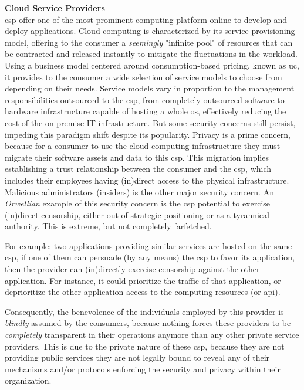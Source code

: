 \documentclass[12pt, titlepage]{uo_temp}
\begin{document}
     \textbf{Cloud Service Providers}\\
     \gls{csp} offer one of the most prominent computing platform online to develop and
     deploy applications.
     Cloud computing is characterized by its service provisioning model, offering to the
     consumer a \emph{seemingly} "infinite pool" of resources that can be contracted and
     released instantly to mitigate the fluctuations in the workload. Using a business
     model centered around consumption-based pricing, known as \gls{uc}, it provides to
     the consumer a wide selection of service models to choose from depending on their
     needs. Service models vary in proportion to the management responsibilities
     outsourced to the \gls{csp}, from completely outsourced software to hardware
     infrastructure capable of hosting a whole \gls{os}, effectively reducing the cost of
     the on-premise IT infrastructure. But some security concerns still persist, impeding
     this paradigm shift despite its popularity. Privacy is a prime concern, because for a
     consumer to use the cloud computing infrastructure they must migrate their software
     assets and data to this \gls{csp}. This migration implies establishing a trust
     relationship between the consumer and the \gls{csp}, which includes their employees
     having (in)direct access to the physical infrastructure. Malicious administrators
     (insiders) is the other major security concern. An \emph{Orwellian} example of this
     security concern is the \gls{csp} potential to exercise (in)direct censorship, either
     out of strategic positioning or as a tyrannical authority. This is extreme, but not
     completely farfetched.
     
     For example: two applications providing similar services are hosted on the same
     \gls{csp}, if one of them can persuade (by any means) the \gls{csp} to favor its
     application, then the provider can (in)directly exercise censorship against the other
     application. For instance, it could prioritize the traffic of that application, or
     deprioritize the other application access to the computing resources (or \gls{api}).

     Consequently, the benevolence of the individuals employed by this provider is
     \emph{blindly} assumed by the consumers, because nothing forces these providers to be
     \emph{completely} transparent in their operations anymore than any other private
     service providers. This is due to the private nature of these \gls{csp}, because they
     are not providing public services they are not legally bound to reveal any of their
     mechanisms and/or protocols enforcing the security and privacy within their
     organization.\\
\end{document}
